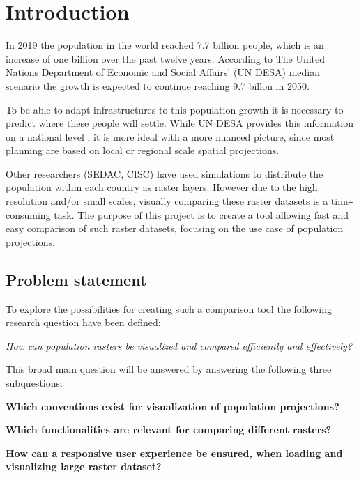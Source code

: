 \chapter{Introduction}

In 2019 the population in the world reached 7.7 billion people, which is an increase of one billion over the past twelve years. According to The United Nations Department of Economic and Social Affairs’ (UN DESA) median scenario the growth is expected to continue reaching 9.7 billon in 2050. \citep{UNDEASHightlights} 

To be able to adapt infrastructures to this population growth it is necessary to predict where these people will settle. While UN DESA provides this information on a national level \citep{NationalPop}, it is more ideal with a more nuanced picture, since most planning are based on local or regional scale spatial projections. \citep{WhyDetailedPop}

Other researchers (SEDAC, CISC) have used simulations to distribute the population within each country as raster layers. However due to the high resolution and/or small scales, visually comparing these raster datasets is a time-consuming task. The purpose of this project is to create a tool allowing fast and easy comparison of such raster datasets, focusing on the use case of population projections.


\section{Problem statement}

To explore the possibilities for creating such a comparison tool the following research question have been defined:

\textit{How can population rasters be visualized and compared efficiently and effectively?}

This broad main question will be answered by answering the following three subquestions:

\textbf{Which conventions exist for visualization of population projections?}

\textbf{Which functionalities are relevant for comparing different rasters?}

\textbf{How can a responsive user experience be ensured, when loading and visualizing large raster dataset?}


